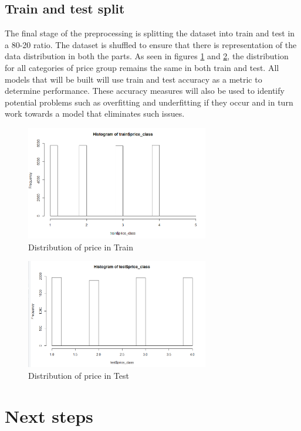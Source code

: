 \documentclass{sig-alternate}
\begin{document}
	\subsection{Train and test split}
	The final stage of the preprocessing is splitting the dataset into train and test in a 80-20 ratio. The dataset is shuffled to ensure that there is representation of the data distribution in both the parts. As seen in figures \ref{trainhist} and \ref{testhist}, the distribution for all categories of price group remains the same in both train and test. All models that will be built will use train and test accuracy as a metric to determine performance. These accuracy measures will also be used to identify potential problems such as overfitting and underfitting if they occur and in turn work towards a model that eliminates such issues.  
	\begin{figure}[ht]
		\includegraphics[width=8cm]{trainhist.png}
		\caption{Distribution of price in Train}
		\label{trainhist}
		\centering
	\end{figure}
\begin{figure}[ht]
	\includegraphics[width=8cm]{testhist.png}
	\caption{Distribution of price in Test}
	\label{testhist}
	\centering
\end{figure}
	\section{Next steps} 
	
	
	
\end{document}
